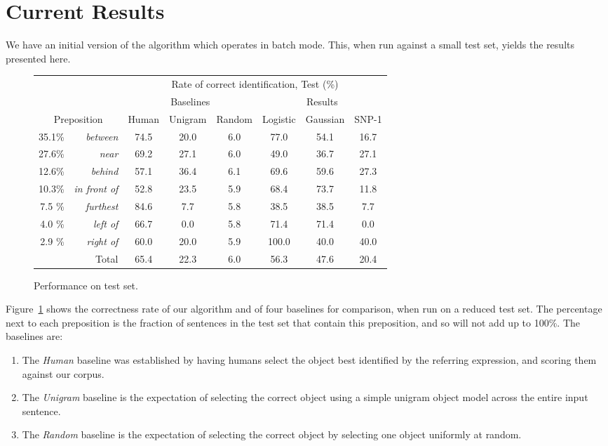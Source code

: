 \documentclass[letterpaper,10pt]{article}
\begin{document}
\section{Current Results}

We have an initial version of the algorithm which operates in batch mode. This, when run against a small test set, yields the results presented here.

\begin{figure}[H]
  \centering
  \begin{tabular}{| r r | c | c | c || c c | c |} \hline
     & & \multicolumn{6}{c|}{Rate of correct identification, Test (\%)} \\
     & & \multicolumn{3}{c||}{Baselines} & \multicolumn{3}{c|}{Results} \\
     \multicolumn{2}{|c|}{Preposition}
			                      &   Human & Unigram & Random &  Logistic & Gaussian & SNP-1 \\\hline
     35.1\% & \textit{between}	  &    74.5 &  20.0 &   6.0 & 77.0 & 54.1 &  16.7   \\
     27.6\% & \textit{near} 	  &    69.2 &  27.1 &   6.0 & 49.0 & 36.7 &  27.1   \\
     12.6\% & \textit{behind}     &    57.1 &  36.4 &   6.1 & 69.6 & 59.6 &  27.3   \\
     10.3\% & \textit{in front of}&    52.8 &  23.5 &   5.9 & 68.4 & 73.7 &  11.8   \\
	 7.5 \% & \textit{furthest}   &    84.6 &  7.7  &   5.8 & 38.5 & 38.5 &   7.7   \\          
     4.0 \% & \textit{left of}    &    66.7 &  0.0  &   5.8 & 71.4 & 71.4 &   0.0   \\
	 2.9 \% & \textit{right of}   &    60.0 &  20.0 &   5.9 &100.0 & 40.0 &  40.0   \\     
\hline\hline
     \multicolumn{2}{|r|}{Total}  &    65.4 &  22.3 &  6.0  & 56.3 & 47.6  &  20.4 \\\hline
  \end{tabular}
  \caption{Performance on test set.}
  \label{fig:results}
\end{figure}

Figure~\ref{fig:results} shows the correctness rate of our algorithm and of four baselines for comparison, when run on a reduced test set. The percentage next to each preposition is the fraction of sentences in the test set that contain this preposition, and so will not add up to 100\%. The baselines are:
\begin{enumerate}[topsep=0pt,itemsep=-1ex,partopsep=1ex,parsep=1ex]
	\item The \emph{Human} baseline was established by having humans select the object best identified by the referring expression, and scoring them against our corpus.
	\item The \emph{Unigram} baseline is the expectation of selecting the correct object using a simple unigram object model across the entire input sentence.
	\item The \emph{Random} baseline is the expectation of selecting the correct object by selecting one object uniformly at random.
\end{enumerate}
\end{document}
